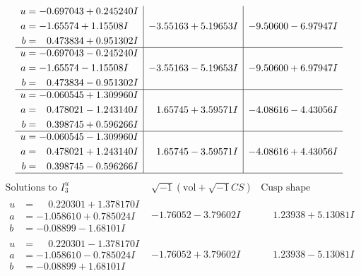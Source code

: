 \documentclass[1p]{elsarticle_modified}
\theoremstyle{definition}
\newcommand{\I}{\sqrt{-1}}
\begin{document}
$$\begin{array}{c|c|c}
\begin{aligned}
u &= -0.697043 + 0.245240 I \\
a &= -1.65574 + 1.15508 I \\
b &= \phantom{-}0.473834 + 0.951302 I\end{aligned}
 & -3.55163 + 5.19653 I & -9.50600 - 6.97947 I \\ \hline\begin{aligned}
u &= -0.697043 - 0.245240 I \\
a &= -1.65574 - 1.15508 I \\
b &= \phantom{-}0.473834 - 0.951302 I\end{aligned}
 & -3.55163 - 5.19653 I & -9.50600 + 6.97947 I \\ \hline\begin{aligned}
u &= -0.060545 + 1.309960 I \\
a &= \phantom{-}0.478021 - 1.243140 I \\
b &= \phantom{-}0.398745 + 0.596266 I\end{aligned}
 & \phantom{-}1.65745 + 3.59571 I & -4.08616 - 4.43056 I \\ \hline\begin{aligned}
u &= -0.060545 - 1.309960 I \\
a &= \phantom{-}0.478021 + 1.243140 I \\
b &= \phantom{-}0.398745 - 0.596266 I\end{aligned}
 & \phantom{-}1.65745 - 3.59571 I & -4.08616 + 4.43056 I\\
 \hline 
 \end{array}$$\newpage$$\begin{array}{c|c|c}  
\text{Solutions to }I^u_{3}& \I (\text{vol} + \sqrt{-1}CS) & \text{Cusp shape}\\
 \hline 
\begin{aligned}
u &= \phantom{-}0.220301 + 1.378170 I \\
a &= -1.058610 + 0.785024 I \\
b &= -0.08899 - 1.68101 I\end{aligned}
 & -1.76052 - 3.79602 I & \phantom{-}1.23938 + 5.13081 I \\ \hline\begin{aligned}
u &= \phantom{-}0.220301 - 1.378170 I \\
a &= -1.058610 - 0.785024 I \\
b &= -0.08899 + 1.68101 I\end{aligned}
 & -1.76052 + 3.79602 I & \phantom{-}1.23938 - 5.13081 I \\ \hline\begin{aligned}

\end{aligned}
\end{array}$$
\end{document}
